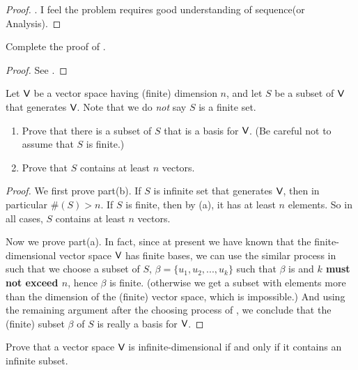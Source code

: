 \begin{proof}
\TODOREF {}.
I feel the problem requires good understanding of sequence(or Analysis).
\end{proof}

\begin{exercise} \label{exercise 1.6.19}
Complete the proof of .
\end{exercise}

\begin{proof}
See .
\end{proof}

\begin{exercise} \label{exercise 1.6.20}
Let \(\textsf{V}\) be a vector space having (finite) dimension \(n\), and let \(S\) be a subset of \(\textsf{V}\) that generates \(\textsf{V}\).
Note that we do \emph{not} say \(S\) is a finite set.
\begin{enumerate}
\item Prove that there is a subset of \(S\) that is a basis for \(\textsf{V}\). (Be careful not to assume that \(S\) is finite.)
\item Prove that \(S\) contains at least \(n\) vectors.
\end{enumerate}
\end{exercise}

\begin{proof}
We first prove part(b).
If \(S\) is infinite set that generates \(\textsf{V}\), then in particular \(\#(S) > n\).
If \(S\) is finite, then by (a), it has at least \(n\) elements.
So in all cases, \(S\) contains at least \(n\) vectors.

Now we prove part(a).
In fact, since at present we have known that the finite-dimensional vector space \(\textsf{V}\) has finite bases, we can use the similar process in  such that we choose a subset of \(S\), \(\beta = \{ u_1, u_2, ..., u_k \}\) such that \(\beta\) is \LID{} and \textbf{\(k\) must not exceed \(n\)}, hence \(\beta\) is finite.
(otherwise we get a \LID{} subset with elements more than the dimension of the (finite) vector space, which is impossible.)
And using the remaining argument after the choosing process of , we conclude that the (finite) \LID{} subset \(\beta\) of \(S\) is really a basis for \(\textsf{V}\).
\end{proof}

\begin{exercise} \label{exercise 1.6.21}
Prove that a vector space \(\textsf{V}\) is infinite-dimensional if and only if it contains an infinite \LID{} subset.
\end{exercise}

